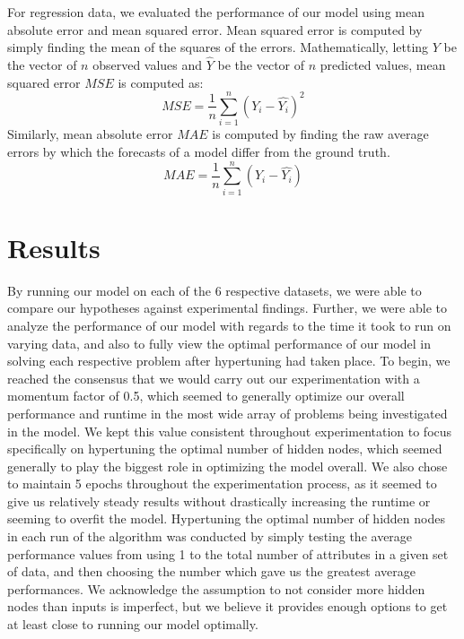\documentclass[twoside,11pt]{article}
\begin{document}
For regression data, we evaluated the performance of our model using mean absolute error and mean squared error. Mean squared error is computed by
simply finding the mean of the squares of the errors. Mathematically, letting $Y$ be the vector of $n$ observed values and $\hat{Y}$ be the vector of $n$ predicted
values, mean squared error $MSE$ is computed as:
\begin{equation}
MSE = \frac{1}{n} \sum_{i=1}^{n} (Y_i - \hat{Y_i})^2
\end{equation}
Similarly, mean absolute error $MAE$ is computed by finding the raw average errors by which the forecasts of a model differ from the ground truth.  
\begin{equation}
MAE = \frac{1}{n} \sum_{i=1}^{n} (Y_i - \hat{Y_i})
\end{equation}


\section{Results}
By running our model on each of the 6 respective datasets, we were able to compare our hypotheses against experimental findings. Further, we were able
to analyze the performance of our model with regards to the time it took to run on varying data, and also to fully view the optimal performance of our model 
in solving each respective problem after hypertuning had taken place. To begin, we reached the consensus that we would carry out our experimentation
with a momentum factor of 0.5, which seemed to generally optimize our overall performance and runtime in the most wide array of problems being investigated 
in the model. We kept this value consistent throughout experimentation to focus specifically on hypertuning the optimal number of hidden nodes, 
which seemed generally to play the biggest role in optimizing the model overall. We also chose to maintain 5 epochs throughout the experimentation 
process, as it seemed to give us relatively steady results without drastically increasing the runtime or seeming to overfit the model. 
Hypertuning the optimal number of hidden nodes in each run of the algorithm
was conducted by simply testing the average performance values from using 1 to the total number of attributes in a given set of data, and then
choosing the number which gave us the greatest average performances.  We acknowledge the assumption to not consider more hidden nodes than inputs is imperfect,
but we believe it provides enough options to get at least close to running our model optimally.
\end{document}
